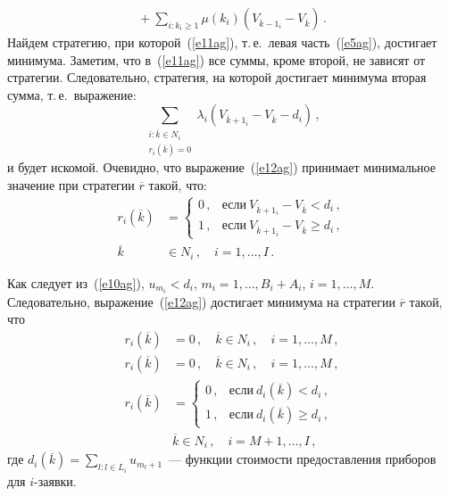 \begin{multicols}{2}
\begin{multline}
{}+ \sum\limits_{i:k_i\geq
1}\mu(k_i) (V_{\overline{k}-1_i}-V_{\overline{k}})\,.
  \label{e11ag}
  \end{multline}
  Найдем стратегию, при которой~(\ref{e11ag}), т.\,е.\ левая часть~(\ref{e5ag}),
достигает минимума. Заметим, что в~(\ref{e11ag}) все суммы, кроме второй, не
зависят от стратегии. Следовательно, стратегия, на которой достигает
минимума вторая сумма, т.\,е.\ выражение:
  \begin{equation}
  \sum\limits_{\substack{{i:\overline{k}\in N_i}\\
  {r_i(\overline{k})=0}}} \lambda_i (V_{\overline{k}+1_i} - V_{\overline{k}} -
d_i )\,,
  \label{e12ag}
  \end{equation}
и будет искомой. Очевидно, что выражение~(\ref{e12ag}) принимает минимальное значение
при стратегии $\overline{r}$ такой, что:
\begin{align*}
r_i (\overline{k} ) &=
\begin{cases}
0\,, & \mbox{если}\ V_{\overline{k}+1_i} - V_{\overline{k}} < d_i\,,\\
1\,, & \mbox{если}\ V_{\overline{k}+1_i } - V_{\overline{k}}\geq d_i\,,
\end{cases}\\
\overline{k} &\in N_i\,,\quad i=1,\ldots ,I\,.
\end{align*}

  
    Как следует из~(\ref{e10ag}), $u_{m_i} <d_i$, $m_i =1,\ldots , B_i+A_i$,
$i=1,\ldots , M$. Следовательно, выражение~(\ref{e12ag}) достигает минимума на стратегии
$\overline{r}$ такой, что
  \begin{align*}
  r_i(\overline{k}) & = 0\,,\quad \overline{k} \in N_i\,,\quad i=1,\ldots , M\,,\\
  r_i (\overline{k}) & = 0\,,\quad \overline{k}\in N_i\,,\quad i=1,\ldots , M\,,\\
  r_i(\overline{k}) & =
  \begin{cases}
  0\,, & \mbox{если}\ d_i(\overline{k}) <d_i\,,\\
  1\,, & \mbox{если}\ d_i(\overline{k}) \geq d_i\,,
  \end{cases}\\
  & \overline{k}\in N_i\,,\quad i=M+1,\ldots , I\,,\
  \end{align*}
  где $d_i(\overline{k}) = \sum\limits_{l:l\in L_i} u_{m_l+1}$~--- функции стоимости
предо\-став\-ле\-ния приборов для $i$-заявки.

\begin{figure*} %
\begin{center}
\mbox{%
\epsfxsize=165.741mm
}
\end{center}
\vspace*{-9pt}
  \end{figure*}


\end{multicols}
